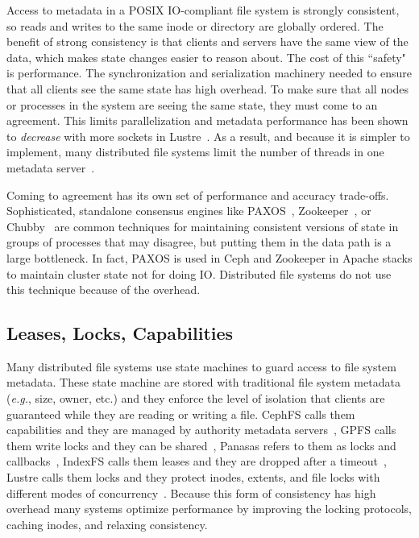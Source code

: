 Access to metadata in a POSIX IO-compliant file system is strongly consistent,
so reads and writes to the same inode or directory are globally ordered.  The
benefit of strong consistency is that clients and servers have the same view of
the data, which makes state changes easier to reason about.  The cost of this
``safety" is performance.  The synchronization and serialization machinery
needed to ensure that all clients see the same state has high overhead.  To
make sure that all nodes or processes in the system are seeing the same state,
they must come to an agreement.  This limits parallelization and metadata
performance has been shown to {\it decrease} with more sockets in
Lustre~\cite{konstantinos:pdsw2014-lustre-metadata}. As a result, and because
it is simpler to implement, many distributed file systems limit the number of
threads in one metadata server~\cite{weil:osdi2006-ceph,
alam:pdsw2011-metadata-scaling, ren:sc2014-indexfs}. 

Coming to agreement has its own set of performance and accuracy trade-offs.
Sophisticated, standalone consensus engines like
PAXOS~\cite{lamport_parttime_1998}, Zookeeper~\cite{hunt_zookeeper_2010}, or
Chubby~\cite{burrows_chubby_2006} are common techniques for maintaining
consistent versions of state in groups of processes that may disagree, but
putting them in the data path is a large bottleneck. In fact, PAXOS is used in
Ceph and Zookeeper in Apache stacks to maintain cluster state not for doing IO.
Distributed file systems do not use this technique because of the overhead.

\subsection{Leases, Locks, Capabilities}

Many distributed file systems use state machines to guard access to file system
metadata.  These state machine are stored with traditional file system metadata
({\it e.g.}, size, owner, etc.) and they enforce the level of isolation that
clients are guaranteed while they are reading or writing a file. CephFS calls
them capabilities and they are managed by authority metadata servers~\cite{},
GPFS calls them write locks and they can be shared~\cite{}, Panasas refers to
them as locks and callbacks~\cite{}, IndexFS calls them leases and they are
dropped after a timeout~\cite{}, Lustre calls them locks and they protect
inodes, extents, and file locks with different modes of
concurrency~\cite{wang:tech09-lustre}.  Because this form of consistency has
high overhead many systems optimize performance by improving the locking
protocols, caching inodes, and relaxing consistency.

